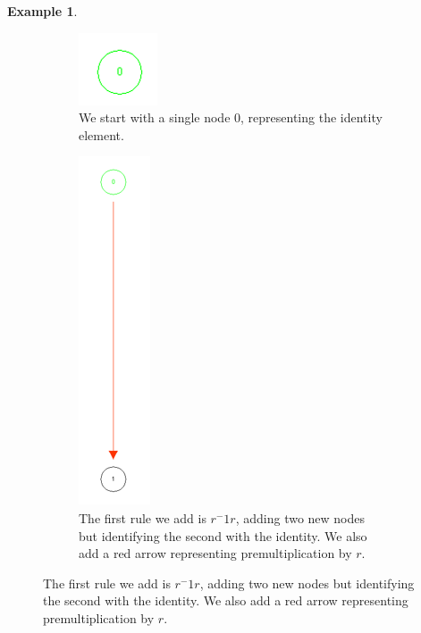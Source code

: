\documentclass[10pt]{article}
\theoremstyle{plain}
\theoremstyle{definition}
\newtheorem{example}[theorem]{Example}
\theoremstyle{definition}
\theoremstyle{definition}
\begin{document}
\begin{multicols}{2}
\begin{example}
	\begin{figure}[p]
		\centering
		\begin{subfigure}{.4\textwidth}
			\centering
			\includegraphics[scale = 0.55]{TC1}
			\caption{We start with a single node $0$, representing the identity element.}
			\label{fig4:sub1}
		\end{subfigure}%
		\begin{subfigure}{.4\textwidth}
			\centering
			\includegraphics[scale = 0.55]{TC2}
			\caption{The first rule we add is $r^-1 r$, adding two new nodes but identifying the second with the identity. We also add a red arrow representing premultiplication by $r$.}
			\label{fig4:sub2}
		\end{subfigure}


\end{figure}
\end{example}
\end{multicols}
\end{document}
